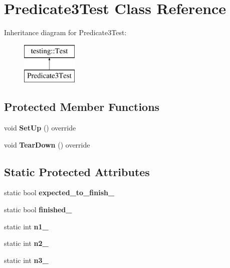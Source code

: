 \hypertarget{classPredicate3Test}{}\section{Predicate3\+Test Class Reference}
\label{classPredicate3Test}
Inheritance diagram for Predicate3\+Test\+:\begin{figure}[H]
\begin{center}
\leavevmode
\includegraphics[height=2.000000cm]{classPredicate3Test}
\end{center}
\end{figure}
\subsection*{Protected Member Functions}
\begin{DoxyCompactItemize}
\item 
\mbox{\label{classPredicate3Test_a4f70b241201bac1bfee5d159702188b4}} 
void {\bfseries Set\+Up} () override
\item 
\mbox{\label{classPredicate3Test_a502f4426fc9f90991a7aadbb304794e6}} 
void {\bfseries Tear\+Down} () override
\end{DoxyCompactItemize}
\subsection*{Static Protected Attributes}
\begin{DoxyCompactItemize}
\item 
\mbox{\label{classPredicate3Test_a42c11555410ee89bf6e59d39336a212c}} 
static bool {\bfseries expected\+\_\+to\+\_\+finish\+\_\+}
\item 
\mbox{\label{classPredicate3Test_aa2ef0fa6aed09d872fb9ae36961b49eb}} 
static bool {\bfseries finished\+\_\+}
\item 
\mbox{\label{classPredicate3Test_ac232320a93f0c1e09886148a3e1929a5}} 
static int {\bfseries n1\+\_\+}
\item 
\mbox{\label{classPredicate3Test_a11049ef16bcaadc8262faf7349c7676e}} 
static int {\bfseries n2\+\_\+}
\item 
\mbox{\label{classPredicate3Test_afc1df6b079ffe22b87479b161d2ad2f7}} 
static int {\bfseries n3\+\_\+}
\end{DoxyCompactItemize}
